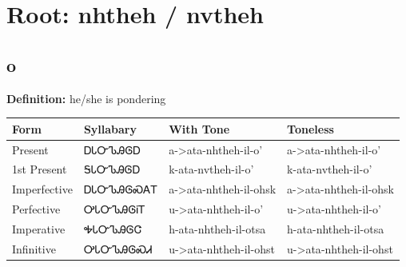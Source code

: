 \documentclass{article}%
\begin{document}
%
\normalsize%
\section*{Root: nhtheh / nvtheh}%
\subsection*{o}%
\textbf{Definition: }%
he/she is pondering%
\\[0.5em]%
\begin{tabular}{|l|l|l|l|}%
\hline%
\textbf{Form}&\textbf{Syllabary}&\textbf{With Tone}&\textbf{Toneless}\\%
\hline%
Present&ᎠᏓᏅᏖᎯᎶᎠ&a{-}>ata{-}nhtheh{-}il{-}o'&a{-}>ata{-}nhtheh{-}il{-}o'\\%
1st Present&ᎦᏓᏅᏖᎯᎶᎠ&k{-}ata{-}nvtheh{-}il{-}o'&k{-}ata{-}nvtheh{-}il{-}o'\\%
Imperfective&ᎠᏓᏅᏖᎯᎶᏍᎪᎢ&a{-}>ata{-}nhtheh{-}il{-}ohsk&a{-}>ata{-}nhtheh{-}il{-}ohsk\\%
Perfective&ᎤᏓᏅᏖᎯᎶᎥᎢ&u{-}>ata{-}nhtheh{-}il{-}o'&u{-}>ata{-}nhtheh{-}il{-}o'\\%
Imperative&ᎭᏓᏅᏖᎯᎶᏣ&h{-}ata{-}nhtheh{-}il{-}otsa&h{-}ata{-}nhtheh{-}il{-}otsa\\%
Infinitive&ᎤᏓᏅᏖᎯᎶᏍᏗ&u{-}>ata{-}nhtheh{-}il{-}ohst&u{-}>ata{-}nhtheh{-}il{-}ohst\\%
\hline%
\end{tabular}%
\\[1em]%
\end{document}
